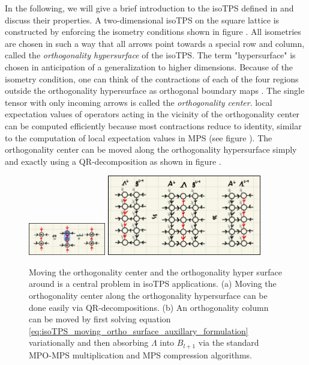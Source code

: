 In the following, we will give a brief introduction to the isoTPS defined in \cite{cite:isometric_tensor_network_states_in_two_dimensions} and discuss their properties. A two-dimensional isoTPS on the square lattice is constructed by enforcing the isometry conditions shown in figure . All isometries are chosen in such a way that all arrows point towards a special row and column, called the \textit{orthogonality hypersurface} of the isoTPS. The term "hypersurface" is chosen in anticipation of a generalization to higher dimensions. Because of the isometry condition, one can think of the contractions of each of the four regions outside the orthogonality hypersurface as orthogonal boundary maps \cite{cite:efficient_simulation_of_dynamics_in_two_dimensional_quantum_spin_systems}. The single tensor with only incoming arrows is called the \textit{orthogonality center}. local expectation values of operators acting in the vicinity of the orthogonality center can be computed efficiently because most contractions reduce to identity, similar to the computation of local expectation values in MPS (see figure ). The orthogonality center can be moved along the orthogonality hypersurface simply and exactly using a QR-decomposition as shown in figure . \par
\begin{figure}
	\centering
	\subcaptionbox{\label{fig:isoTPS_moving_ortho_center}}
	{%
		\includegraphics[width=0.3\textwidth]{figures/Tensor_Networks/Moving_ortho_center.jpeg}
	}
	\subcaptionbox{\label{fig:isoTPS_moving_ortho_column}}
	{%
		\includegraphics[width=0.6\textwidth]{figures/Tensor_Networks/variational_MM.jpeg}
	}
	\caption{Moving the orthogonality center and the orthogonality hyper surface around is a central problem in isoTPS applications. (a) Moving the orthogonality center along the orthogonality hypersurface can be done easily via QR-decompositions. (b) An orthogonality column can be moved by first solving equation \eqref{eq:isoTPS_moving_ortho_surface_auxillary_formulation} variationally and then absorbing $\Lambda$ into $B_{l+1}$ via the standard MPO-MPS multiplication and MPS compression algorithms.}
	\label{fig:isoTPS_moving_ortho_center_and_column}
\end{figure}
